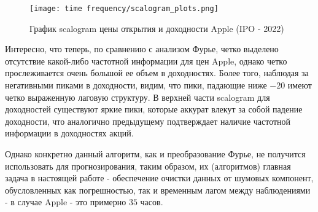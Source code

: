 \begin{figure}[H]
	\centering
	\texttt{[image: time frequency/scalogram\_plots.png]}
	\caption{График scalogram цены открытия и доходности Apple (IPO - 2022)}
	\label{fig::wavelet_example}
\end{figure}
Интересно, что теперь, по сравнению с анализом Фурье, четко выделено отсутствие какой-либо частотной информации для цен Apple, однако четко прослеживается очень большой ее объем в доходностях. Более того, наблюдая за негативными пиками в доходности, видим, что пики, падающие ниже $-20$ имеют четко выраженную лаговую структуру. В верхней части scalogram для доходностей существуют яркие пики, которые аккурат влекут за собой падение доходности, что аналогично предыдущему подтверждает наличие частотной информации в доходностях акций.

Однако конкретно данный алгоритм, как и преобразование Фурье, не получится использовать для прогнозирования, таким образом, их (алгоритмов) главная задача в настоящей работе - обеспечение очистки данных от шумовых компонент, обусловленных как погрешностью, так и временным лагом между наблюдениями - в случае Apple - это примерно $35$ часов.

